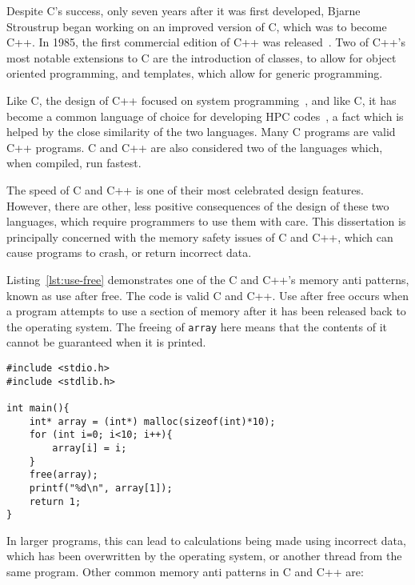 Despite C's success, only seven years after it was first developed, Bjarne Stroustrup began working on an improved version of C, which was to become C++. In 1985, the first commercial edition of C++ was released~\cite{CPPFAQS}. Two of C++'s most notable extensions to C are the introduction of classes, to allow for object oriented programming, and templates, which allow for generic programming. 

Like C, the design of C++ focused on system programming~\cite{CplusEssence}, and like C, it has become a common language of choice for developing HPC codes~\cite{foam}, a fact which is helped by the close similarity of the two languages. Many C programs are valid C++ programs. C and C++ are also considered two of the languages which, when compiled, run fastest.

The speed of C and C++ is one of their most celebrated design features. However, there are other, less positive consequences of the design of these two languages, which require programmers to use them with care. This dissertation is principally concerned with the memory safety issues of C and C++, which can cause programs to crash, or return incorrect data.

Listing~\ref{lst:use-free} demonstrates one of the C and C++'s memory anti patterns, known as use after free. The code is valid C and C++. Use after free occurs when a program attempts to use a section of memory after it has been released back to the operating system.
The freeing of \texttt{array} here means that the contents of it cannot be guaranteed when it is printed.

\begin{code}
\begin{verbatim}
#include <stdio.h>
#include <stdlib.h>

int main(){
    int* array = (int*) malloc(sizeof(int)*10);
    for (int i=0; i<10; i++){
        array[i] = i;
    }
    free(array);
    printf("%d\n", array[1]);
    return 1;
}
\end{verbatim}
\label{lst:use-free}
\end{code}

In larger programs, this can lead to calculations being made using incorrect data, which has been overwritten by the operating system, or another thread from the same program. Other common memory anti patterns in C and C++ are:

